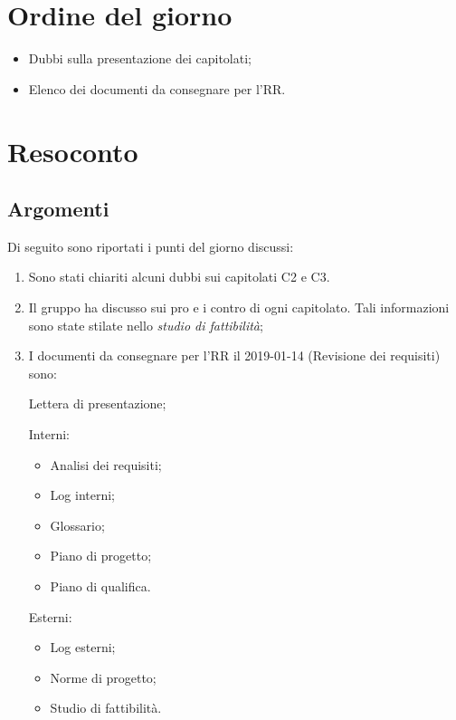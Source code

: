 \documentclass[12pt]{article}
\begin{document}
\section{Ordine del giorno}
    \begin{itemize}
        \item Dubbi sulla presentazione dei capitolati;
        \item Elenco dei documenti da consegnare per l'RR.
    \end{itemize}
    
    \newpage
\section{Resoconto}
    \subsection{Argomenti}
        Di seguito sono riportati i punti del giorno discussi:
    \begin{enumerate}
        \item Sono stati chiariti alcuni dubbi sui capitolati C2 e C3.
        \item Il gruppo ha discusso sui pro e i contro di ogni capitolato. Tali informazioni sono state stilate nello \textit{studio di fattibilità};
        \item I documenti da consegnare per l'RR il 2019-01-14 (Revisione dei requisiti) sono:
            
            Lettera di presentazione;
            
            Interni:
            \begin{itemize}
            \item Analisi dei requisiti;
            \item Log interni;
            \item Glossario;
            \item Piano di progetto;
            \item Piano di qualifica.
            \end{itemize}
            
            Esterni:
            \begin{itemize}
            \item Log esterni;
            \item Norme di progetto;
            \item Studio di fattibilità.
            \end{itemize}
    \end{enumerate}
\end{document}
